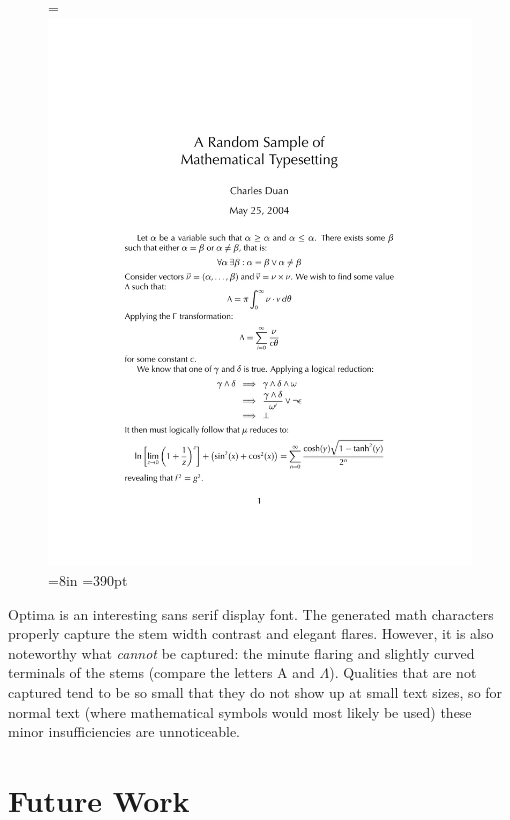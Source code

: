\documentclass[preprint]{ltugproc}
\begin{document}
\begin{figure}
\centering
=\hbox{\lower 1.5in\vbox{\moveleft 112.1475pt \hbox{\includegraphics{optima}}}}
=8in =390pt
\leavevmode{}
\end{figure}

Optima is an interesting sans serif display font. The generated math characters
properly capture the stem width contrast and elegant flares. However, it is also
noteworthy what \emph{cannot} be captured: the minute flaring and slightly
curved terminals of the stems (compare the letters A and $\Lambda$). Qualities
that are not captured tend to be so small that they do not show up at small text
sizes, so for normal text (where mathematical symbols would most likely be used)
these minor insufficiencies are unnoticeable.

\section{Future Work}
\end{document}
